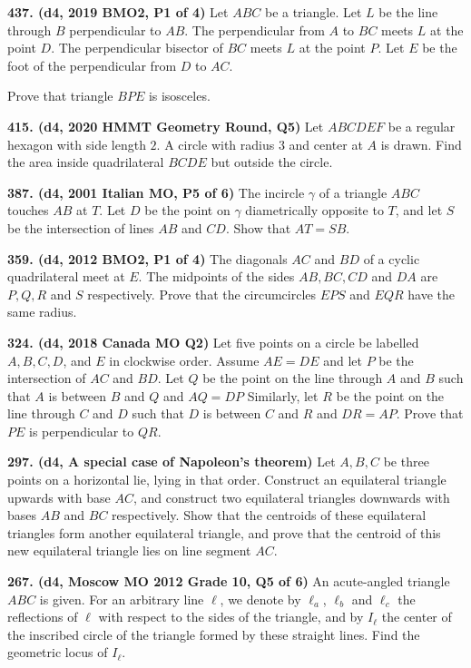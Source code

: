\documentclass{article}
\begin{document}
\textbf{437. (\color{red}d4\color{black}, 2019 BMO2, P1 of 4)} Let $ABC$ be a triangle. Let $L$ be the line through $B$ perpendicular to $AB$. The perpendicular from $A$ to $BC$ meets $L$ at the point $D$. The perpendicular bisector of $BC$ meets $L$ at the point $P$. Let $E$ be the foot of the perpendicular from $D$ to $AC$.

Prove that triangle $BPE$ is isosceles.

\textbf{415. (\color{red}d4\color{black}, 2020 HMMT Geometry Round, Q5)} Let $ABCDEF$ be a regular hexagon with side length $2$. A circle with radius $3$ and center at $A$ is drawn. Find the area inside quadrilateral $BCDE$ but outside the circle.

\textbf{387. (\color{red}d4\color{black}, 2001 Italian MO, P5 of 6)} The incircle $\gamma$ of a triangle $ABC$ touches $AB$ at $T$. Let $D$ be the point on $\gamma$ diametrically opposite to $T$, and let $S$ be the intersection of lines $AB$ and $CD$. Show that $AT = SB$.

\textbf{359. (\color{red}d4\color{black}, 2012 BMO2, P1 of 4)} The diagonals $AC$ and $BD$ of a cyclic quadrilateral meet at $E$. The midpoints of the sides $AB, BC, CD$ and $DA$ are $P, Q, R$ and $S$ respectively. Prove that the circumcircles $EPS$ and $EQR$ have the same radius.

\textbf{324. (\color{red}d4\color{black}, 2018 Canada MO Q2)} Let five points on a circle be labelled $A, B, C, D$, and $E$ in clockwise order. Assume $AE = DE$ and let $P$ be the intersection of $AC$ and $BD$. Let $Q$ be the point on the line through $A$ and $B$ such that $A$ is between $B$ and $Q$ and $AQ = DP$ Similarly, let $R$ be the point on the line through $C$ and $D$ such that $D$ is between $C$ and $R$ and $DR = AP$. Prove that $PE$ is perpendicular to $QR$.

\textbf{297. (\color{red}d4\color{black}, A special case of Napoleon's theorem)} Let \(A, B, C\) be three points on a horizontal lie, lying in that order. Construct an equilateral triangle upwards with base \(AC\), and construct two equilateral triangles downwards with bases \(AB\) and \(BC\) respectively. Show that the centroids of these equilateral triangles form another equilateral triangle, and prove that the centroid of this new equilateral triangle lies on line segment \(AC\).

\textbf{267. (\color{red}d4\color{black}, Moscow MO 2012 Grade 10, Q5 of 6)} An acute-angled triangle $ABC$ is given. For an arbitrary line $\ell$, we denote by $\ell_a$, $\ell_b$ and $\ell_c$ the reflections of $\ell$ with respect to the sides of the triangle, and by $I_\ell$ the center of the inscribed circle of the triangle formed by these straight lines. Find the geometric locus of $I_\ell$.
\end{document}

